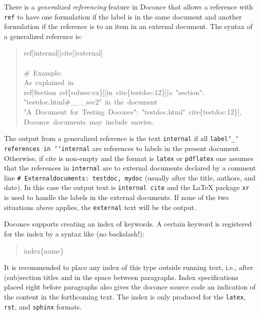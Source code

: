 \documentclass[a4paper]{article}
\begin{document}
There is a \emph{generalized referencing} feature in Doconce that allows
a reference with \texttt{ref} to have one formulation if the label is
in the same document and another formulation if the reference is
to an item in an external document. The syntax of a generalized
reference is:
%
\begin{quote}{\ttfamily \raggedright \noindent
ref{[}internal{]}{[}cite{]}{[}external{]}\\
~\\
\#~Example:\\
As~explained~in\\
ref{[}Section~ref\{subsec:ex\}{]}{[}in~cite\{testdoc:12\}{]}{[}a~"section":\\
"testdoc.html\#\_\_\_sec2"~in~the~document\\
"A~Document~for~Testing~Doconce":~"testdoc.html"~cite\{testdoc:12\}{]},\\
Doconce~documents~may~include~movies.
}
\end{quote}

The output from a generalized reference is the text \texttt{internal} if all
\texttt{label`\_` references in `{}`internal} are references to labels in the
present document. Otherwise, if cite is non-empty and the format is
\texttt{latex} or \texttt{pdflatex} one assumes that the references in \texttt{internal}
are to external documents declared by a comment line \texttt{\#
Externaldocuments: testdoc, mydoc} (usually after the title, authors,
and date). In this case the output text is \texttt{internal cite} and the
LaTeX package \texttt{xr} is used to handle the labels in the external
documents.  If none of the two situations above applies, the
\texttt{external} text will be the output.

Doconce supports creating an index of keywords. A certain keyword
is registered for the index by a syntax like (no
backslash!):
%
\begin{quote}{\ttfamily \raggedright \noindent
index\{name\}
}
\end{quote}

It is recommended to place any index of this type outside
running text, i.e., after (sub)section titles and in the space between
paragraphs. Index specifications placed right before paragraphs also
gives the doconce source code an indication of the content in the
forthcoming text. The index is only produced for the \texttt{latex}, \texttt{rst}, and
\texttt{sphinx} formats.


\end{document}
